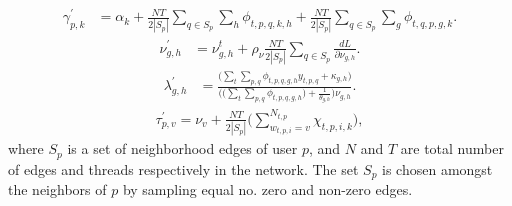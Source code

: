 \documentclass{sig-alternate}
\begin{document}
{\small
\begin{align}
\gamma_{p,k}^{'} &= \alpha_{k} + \frac{NT}{2|S_p|}\sum_{q \in S_p} \sum_{h}
\! \phi_{t,p,q,k,h} + \frac{NT}{2|S_p|}\sum_{q \in S_p} \! \sum_{g} \!
\phi_{t,q,p,g,k}. 
\label{eqn:gammaUpStoc}
\end{align}
\vspace*{-1.5\baselineskip}
\begin{align}
\nu_{g,h}^{'} &= \nu_{g,h}^{t}+\rho_\nu \frac{NT}{2|S_p|}\sum_{q \in
S_p}\frac{dL}{\partial\nu_{g,h}}.
\label{eqn:nuUpStoc}
\end{align}
\vspace*{-1.5\baselineskip}
\begin{align}
\lambda_{g,h}^{'} &= \frac{\bigg( \sum_{t} \! \sum_{p,q} \! \phi_{t,p,q,g,h}
y_{t,p,q} + \kappa_{g,h} \bigg) }{
 \bigg( \bigg( \sum_{t} \! \sum_{p,q} \! \phi_{t,p,q,g,h} \bigg) + 
\frac{1}{\theta_{g,h}} \bigg) \nu_{g,h}}.
\label{eqn:lambdaUpStoc}
\end{align}
\vspace*{-1.5\baselineskip}
\begin{align}
\tau_{p,v}^{'} = \nu_{v} + \frac{NT}{2|S_p|} 
\bigg(\sum_{w_{t,p,i}=v}^{N_{t,p}} \chi_{t,p,i,k} \bigg),
\label{eqn:tauUpStoc}
\end{align} 
}
where $S_p$ is a set of neighborhood edges of user $p$, and $N$ and $T$ are
total number of edges and threads respectively in the network. The set $S_p$ is
chosen amongst the neighbors of $p$ by sampling equal no. zero and non-zero
edges. 

\normalsize
\IncMargin{1em}
\end{document}
